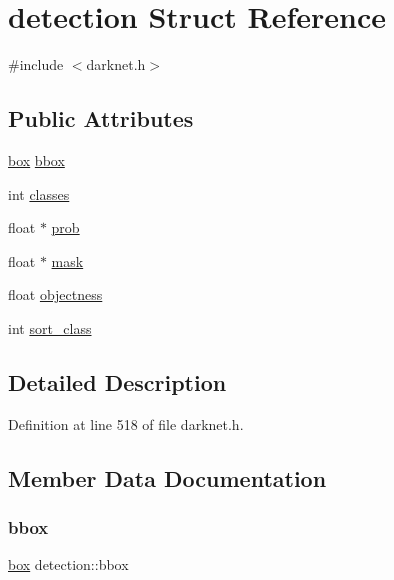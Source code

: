 \hypertarget{structdetection}{}\section{detection Struct Reference}
\label{structdetection}


{\ttfamily \#include $<$darknet.\+h$>$}

\subsection*{Public Attributes}
\begin{DoxyCompactItemize}
\item 
\mbox{\hyperlink{structbox}{box}} \mbox{\hyperlink{structdetection_a0e96ec314ffa1b5462b81752d1842191}{bbox}}
\item 
int \mbox{\hyperlink{structdetection_a5501f226bdc7ce3630666a8065fa70b9}{classes}}
\item 
float $\ast$ \mbox{\hyperlink{structdetection_a135fa8f73988691651cb54335e6e20c2}{prob}}
\item 
float $\ast$ \mbox{\hyperlink{structdetection_a52d75f4c96f7ae42075f4792b1852946}{mask}}
\item 
float \mbox{\hyperlink{structdetection_afd81464803f6cca28d0d3171158f0d52}{objectness}}
\item 
int \mbox{\hyperlink{structdetection_a134b1d6d4fa5b3356af1e4af9d53f344}{sort\+\_\+class}}
\end{DoxyCompactItemize}


\subsection{Detailed Description}


Definition at line 518 of file darknet.\+h.



\subsection{Member Data Documentation}
\mbox{\label{structdetection_a0e96ec314ffa1b5462b81752d1842191}} 
\subsubsection{\texorpdfstring{bbox}{bbox}}
{\footnotesize\ttfamily \mbox{\hyperlink{structbox}{box}} detection\+::bbox}




